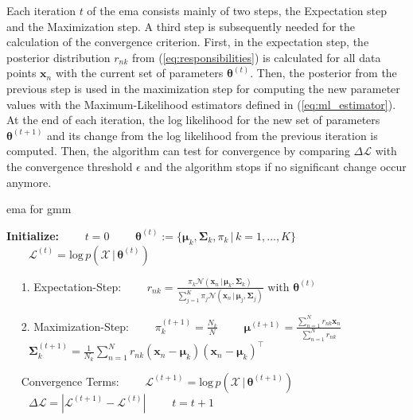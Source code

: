 \documentclass[../../../main.tex]{subfiles}
\begin{document}
Each iteration $t$ of the \acrshort{ema} consists mainly of two steps, the Expectation step and the Maximization step. A third step is subsequently needed for the calculation of the convergence criterion. First, in the expectation step, the posterior distribution $r_{nk}$ from (\ref{eq:responsibilities}) is calculated for all data points $\bm{x}_n$ with the current set of parameters $\bm{\theta}^{(t)}$. Then, the posterior from the previous step is used in the maximization step for computing the new parameter values with the Maximum-Likelihood estimators defined in (\ref{eq:ml_estimator}). At the end of each iteration, the log likelihood for the new set of parameters $\bm{\theta}^{(t+1)}$ and its change from the log likelihood from the previous iteration is computed. Then, the algorithm can test for convergence by comparing $\Delta \mathcal{L}$ with the convergence threshold $\epsilon$ and the algorithm stops if no significant change occur anymore.

\begin{algorithm}
    \caption{\gls{ema} for \gls{gmm}}
    \label{alg:ema_gmm}
    \begin{algorithmic}[1]
        \STATEx \textbf{Initialize:}
        \STATE $\qquad t = 0$
        \STATE $\qquad \bm{\theta}^{(t)} := \{ \bm{\mu}_k, \bm{\Sigma}_k, \pi_k \, | \, k=1,\dots,K \}$
        \STATE $\qquad \mathcal{L}^{(t)} = \text{log} \, p(\mathcal{X} \, | \, \bm{\theta}^{(t)})$

            \STATEx $\quad$ 1. Expectation-Step:
            \STATE $\qquad r_{nk} = \frac{\pi_k \mathcal{N}(\bm{x}_n \, | \, \bm{\mu}_k, \bm{\Sigma}_k)}{\sum_{j=1}^K \pi_j \mathcal{N}(\bm{x}_n \, | \, \bm{\mu}_j, \bm{\Sigma}_j)} \text{ with } \bm{\theta}^{(t)}$

            \STATEx $\quad$ 2. Maximization-Step:
            \STATE $\qquad \pi_k^{(t+1)} = \frac{N_k}{N}$
            \STATE $\qquad \bm{\mu}^{(t+1)} = \frac{\sum_{n=1}^N r_{nk} \bm{x}_n}{\sum_{n=1}^N r_{nk}}$
            \STATE $\qquad \bm{\Sigma}_k^{(t+1)} = \frac{1}{N_k}\sum_{n=1}^N r_{nk}(\bm{x}_n-\bm{\mu}_k)(\bm{x}_n-\bm{\mu}_k)^\top$

            \STATEx $\quad$ Convergence Terms:
            \STATE $\qquad \mathcal{L}^{(t+1)} = \text{log} \, p(\mathcal{X} \, | \, \bm{\theta}^{(t+1)})$
            \STATE $\qquad \Delta \mathcal{L} = | \mathcal{L}^{(t+1)} - \mathcal{L}^{(t)} |$
            \STATE $\qquad t = t+1$

        \ENDWHILE
    \end{algorithmic}
 \end{algorithm}
\end{document}
